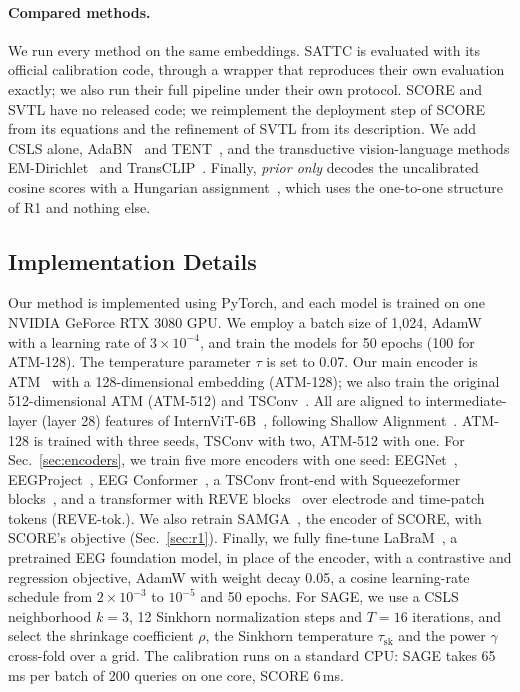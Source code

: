 \documentclass[10pt,twocolumn,letterpaper]{article}
\begin{document}
\paragraph{Compared methods.}
We run every method on the same embeddings. SATTC is evaluated with its official calibration code, through a wrapper that reproduces their own evaluation exactly; we also run their full pipeline under their own protocol. SCORE and SVTL have no released code; we reimplement the deployment step of SCORE from its equations and the refinement of SVTL from its description. We add CSLS alone, AdaBN~\cite{li2018adabn} and TENT~\cite{wang2021tent}, and the transductive vision-language methods EM-Dirichlet~\cite{martin2024transductive} and TransCLIP~\cite{zanella2024transclip}. Finally, \emph{prior only} decodes the uncalibrated cosine scores with a Hungarian assignment~\cite{kuhn1955hungarian}, which uses the one-to-one structure of R1 and nothing else.

\subsection{Implementation Details}
\label{sec:implementation}

Our method is implemented using PyTorch, and each model is trained on one NVIDIA GeForce RTX 3080 GPU. We employ a batch size of 1,024, AdamW with a learning rate of $3\times10^{-4}$, and train the models for 50 epochs (100 for ATM-128). The temperature parameter $\tau$ is set to 0.07. Our main encoder is ATM~\cite{li2024atm} with a 128-dimensional embedding (ATM-128); we also train the original 512-dimensional ATM (ATM-512) and TSConv~\cite{song2024nice}. All are aligned to intermediate-layer (layer 28) features of InternViT-6B~\cite{chen2024internvl}, following Shallow Alignment~\cite{du2025shallow}. ATM-128 is trained with three seeds, TSConv with two, ATM-512 with one. For Sec.~\ref{sec:encoders}, we train five more encoders with one seed: EEGNet~\cite{lawhern2018eegnet}, EEGProject~\cite{du2025shallow}, EEG Conformer~\cite{song2023eegconformer}, a TSConv front-end with Squeezeformer blocks~\cite{kim2022squeezeformer}, and a transformer with REVE blocks~\cite{elouahidi2025reve} over electrode and time-patch tokens (REVE-tok.). We also retrain SAMGA~\cite{jiang2026samga}, the encoder of SCORE, with SCORE's objective (Sec.~\ref{sec:r1}). Finally, we fully fine-tune LaBraM~\cite{jiang2024labram}, a pretrained EEG foundation model, in place of the encoder, with a contrastive and regression objective, AdamW with weight decay 0.05, a cosine learning-rate schedule from $2\times10^{-3}$ to $10^{-5}$ and 50 epochs. For SAGE, we use a CSLS neighborhood $k=3$, 12 Sinkhorn normalization steps and $T=16$ iterations, and select the shrinkage coefficient $\rho$, the Sinkhorn temperature $\tau_{\mathrm{sk}}$ and the power $\gamma$ cross-fold over a grid. The calibration runs on a standard CPU: SAGE takes 65\,ms per batch of 200 queries on one core, SCORE 6\,ms.
\end{document}
